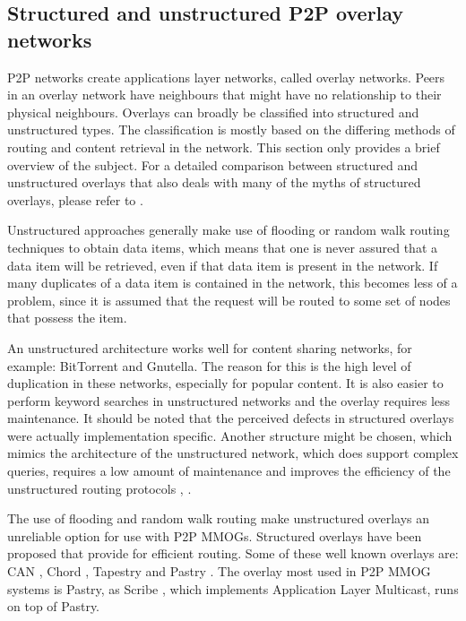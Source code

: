 \documentclass[10pt,a4paper,journal,cspaper,compsoc]{IEEEtran}
\begin{document}

\subsection{Structured and unstructured P2P overlay networks}
\label{overlays}

P2P networks create applications layer networks, called overlay networks. Peers in an overlay network have neighbours that might have no relationship
to their physical neighbours. Overlays can broadly be classified into structured and unstructured types. The classification is mostly based on the
differing methods of routing and content retrieval in the network. This section only provides a brief overview of the subject. For a detailed
comparison between structured and unstructured overlays that also deals with many of the myths of structured overlays, please refer to
\cite{Castro_structured_overlay_myths}.

Unstructured approaches generally make use of flooding or random walk routing techniques to obtain data items, which means that one is never assured
that a data item will be retrieved, even if that data item is present in the network. If many duplicates of a data item is contained in the network,
this becomes less of a problem, since it is assumed that the request will be routed to some set of nodes that possess the item.

An unstructured architecture works well for content sharing networks, for example: BitTorrent and Gnutella. The reason for this is the high level of
duplication in these networks, especially for popular content. It is also easier to perform keyword searches in unstructured networks and the overlay
requires less maintenance. It should be noted that the perceived defects in structured overlays were actually implementation specific. Another
structure might be chosen, which mimics the architecture of the unstructured network, which does support complex queries, requires a low amount of
maintenance and improves the efficiency of the unstructured routing protocols \cite{Castro_structured_overlay_myths},
\cite{Castro_structured_gnutella}.

The use of flooding and random walk routing make unstructured overlays an unreliable option for use with P2P MMOGs. Structured overlays have been
proposed that provide for efficient routing. Some of these well known overlays are: CAN \cite{CAN}, Chord \cite{chord}, Tapestry \cite{tapestry} and
Pastry \cite{pastry}. The overlay most used in P2P MMOG systems is Pastry, as Scribe \cite{scribe}, which implements Application Layer Multicast,
runs on top of Pastry.
\end{document}
